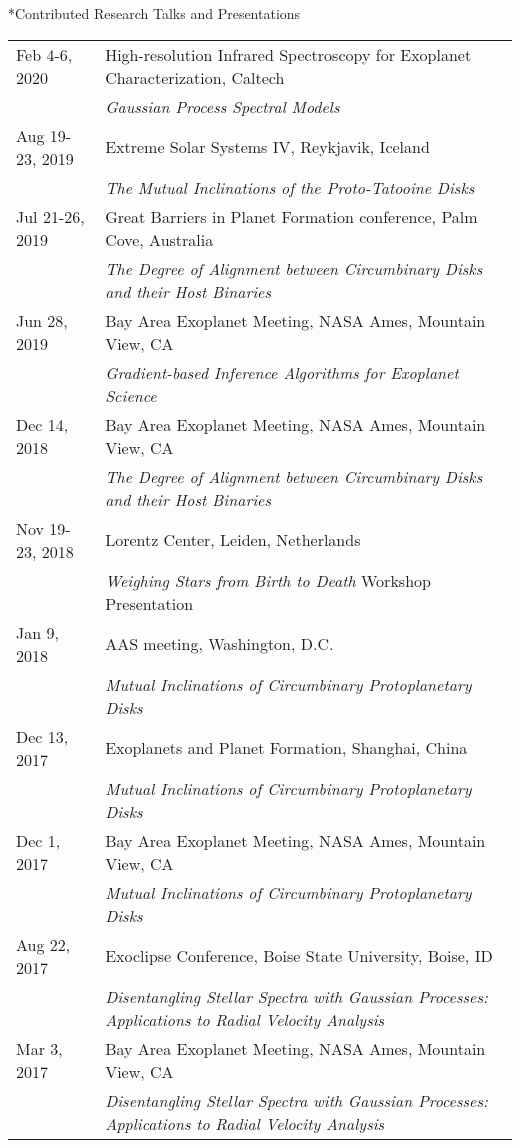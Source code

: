 \documentclass[10pt]{article}
\makeatletter
\newcommand{\rowskip}{1.2mm}
\renewcommand{\section}{\@startsection{section}{1}{0pt}{-\baselineskip}{0.5\baselineskip}{\scshape\color{myblue1}}}
\makeatother
\begin{document}
\section*{Contributed Research Talks and Presentations}
\begin{tabular*}{\textwidth}{@{\hspace{10pt}}p{1.2in}l}
  Feb 4-6, 2020 & High-resolution Infrared Spectroscopy for Exoplanet Characterization, Caltech \\
  & \emph{Gaussian Process Spectral Models} \\[\rowskip]
  Aug 19-23, 2019 & Extreme Solar Systems IV, Reykjavik, Iceland\\ 
  & \emph{The Mutual Inclinations of the Proto-Tatooine Disks} \\[\rowskip]
  Jul 21-26, 2019 & Great Barriers in Planet Formation conference, Palm Cove, Australia\\
  & \emph{The Degree of Alignment between Circumbinary Disks and their Host Binaries} \\[\rowskip]
  Jun 28, 2019 & Bay Area Exoplanet Meeting, NASA Ames, Mountain View, CA\\
  & \emph{Gradient-based Inference Algorithms for Exoplanet Science} \\[\rowskip]
  Dec 14, 2018 & Bay Area Exoplanet Meeting, NASA Ames, Mountain View, CA\\
  & \emph{The Degree of Alignment between Circumbinary Disks and their Host Binaries} \\[\rowskip]
  Nov 19-23, 2018 & Lorentz Center, Leiden, Netherlands\\
  & \emph{Weighing Stars from Birth to Death} Workshop Presentation \\[\rowskip]
  Jan 9, 2018 & AAS meeting, Washington, D.C. \\
  & \emph{Mutual Inclinations of Circumbinary Protoplanetary Disks} \\[\rowskip]
  Dec 13, 2017 & Exoplanets and Planet Formation, Shanghai, China \\
  & \emph{Mutual Inclinations of Circumbinary Protoplanetary Disks} \\[\rowskip]
  Dec 1, 2017 & Bay Area Exoplanet Meeting, NASA Ames, Mountain View, CA\\
  & \emph{Mutual Inclinations of Circumbinary Protoplanetary Disks} \\[\rowskip]
  Aug 22, 2017 & Exoclipse Conference, Boise State University, Boise, ID\\
  & \emph{Disentangling Stellar Spectra with Gaussian Processes: Applications to Radial Velocity Analysis} \\[\rowskip]
  Mar 3, 2017 & Bay Area Exoplanet Meeting, NASA Ames, Mountain View, CA\\
  & \emph{Disentangling Stellar Spectra with Gaussian Processes: Applications to Radial Velocity Analysis} \\[\rowskip]
\end{tabular*}
\end{document}
